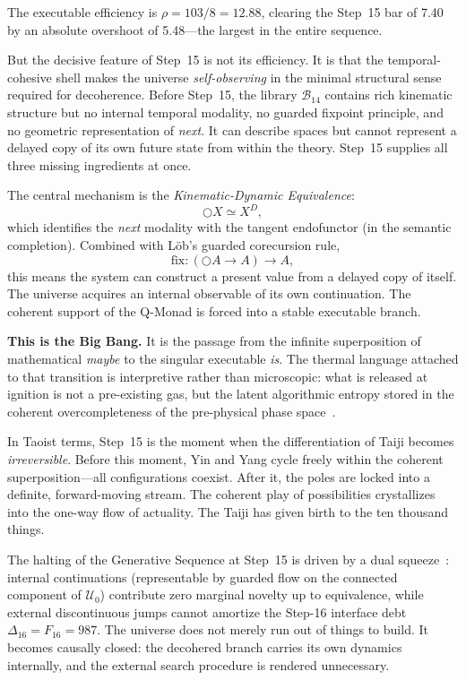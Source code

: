 \documentclass[12pt,a4paper]{article}
\newcommand{\nextmod}{\bigcirc}
\begin{document}
The executable efficiency is $\rho = 103/8 = 12.88$, clearing the Step~15 bar of 7.40 by an absolute overshoot of 5.48---the largest in the entire sequence.

But the decisive feature of Step~15 is not its efficiency. It is that the temporal-cohesive shell makes the universe \emph{self-observing} in the minimal structural sense required for decoherence. Before Step~15, the library $\mathcal{B}_{14}$ contains rich kinematic structure but no internal temporal modality, no guarded fixpoint principle, and no geometric representation of \emph{next}. It can describe spaces but cannot represent a delayed copy of its own future state from within the theory. Step~15 supplies all three missing ingredients at once.

The central mechanism is the \emph{Kinematic-Dynamic Equivalence}:
\begin{equation}
\nextmod X \simeq X^D,
\label{eq:kde}
\end{equation}
which identifies the \emph{next} modality with the tangent endofunctor (in the semantic completion). Combined with L\"ob's guarded corecursion rule,
\begin{equation}
\mathrm{fix} : (\nextmod A \to A) \to A,
\label{eq:lob}
\end{equation}
this means the system can construct a present value from a delayed copy of itself. The universe acquires an internal observable of its own continuation. The coherent support of the Q-Monad is forced into a stable executable branch.

\textbf{This is the Big Bang.} It is the passage from the infinite superposition of mathematical \emph{maybe} to the singular executable \emph{is}. The thermal language attached to that transition is interpretive rather than microscopic: what is released at ignition is not a pre-existing gas, but the latent algorithmic entropy stored in the coherent overcompleteness of the pre-physical phase space~\cite{pen2}.

In Taoist terms, Step~15 is the moment when the differentiation of Taiji becomes \emph{irreversible}. Before this moment, Yin and Yang cycle freely within the coherent superposition---all configurations coexist. After it, the poles are locked into a definite, forward-moving stream. The coherent play of possibilities crystallizes into the one-way flow of actuality. The Taiji has given birth to the ten thousand things.

The halting of the Generative Sequence at Step~15 is driven by a dual squeeze~\cite{pen1}: internal continuations (representable by guarded flow on the connected component of $\mathcal{U}_0$) contribute zero marginal novelty up to equivalence, while external discontinuous jumps cannot amortize the Step-16 interface debt $\Delta_{16} = F_{16} = 987$. The universe does not merely run out of things to build. It becomes causally closed: the decohered branch carries its own dynamics internally, and the external search procedure is rendered unnecessary.
\end{document}
